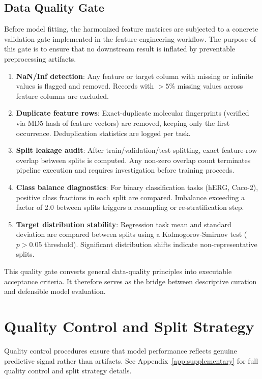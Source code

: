 \documentclass[a4paper,11pt,twoside]{report}
\begin{document}
\subsection{Data Quality Gate}
\label{sec:phase3a_quality}

Before model fitting, the harmonized feature matrices are subjected to a concrete validation gate implemented in the feature-engineering workflow. The purpose of this gate is to ensure that no downstream result is inflated by preventable preprocessing artifacts.

\begin{enumerate}
\item \textbf{NaN/Inf detection}: Any feature or target column with missing or infinite values is flagged and removed. Records with $>5\%$ missing values across feature columns are excluded.
\item \textbf{Duplicate feature rows}: Exact-duplicate molecular fingerprints (verified via MD5 hash of feature vectors) are removed, keeping only the first occurrence. Deduplication statistics are logged per task.
\item \textbf{Split leakage audit}: After train/validation/test splitting, exact feature-row overlap between splits is computed. Any non-zero overlap count terminates pipeline execution and requires investigation before training proceeds.
\item \textbf{Class balance diagnostics}: For binary classification tasks (hERG, Caco-2), positive class fractions in each split are compared. Imbalance exceeding a factor of 2.0 between splits triggers a resampling or re-stratification step.
\item \textbf{Target distribution stability}: Regression task mean and standard deviation are compared between splits using a Kolmogorov-Smirnov test ($p>0.05$ threshold). Significant distribution shifts indicate non-representative splits.
\end{enumerate}

This quality gate converts general data-quality principles into executable acceptance criteria. It therefore serves as the bridge between descriptive curation and defensible model evaluation.

\section{Quality Control and Split Strategy}

Quality control procedures ensure that model performance reflects genuine predictive signal rather than artifacts. See Appendix~\ref{app:supplementary} for full quality control and split strategy details.
\end{document}
